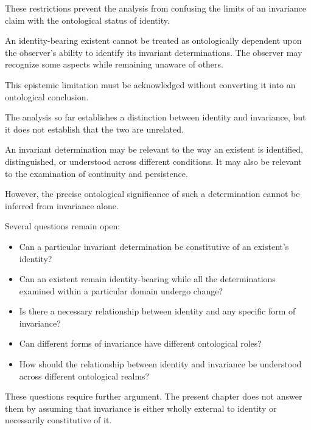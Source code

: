 These restrictions prevent the analysis from
confusing the limits of an invariance claim with
the ontological status of identity.

An identity-bearing existent cannot be treated
as ontologically dependent upon the observer's
ability to identify its invariant determinations.
The observer may recognize some aspects while
remaining unaware of others.

This epistemic limitation must be acknowledged
without converting it into an ontological
conclusion.


The analysis so far establishes a distinction
between identity and invariance, but it does not
establish that the two are unrelated.

An invariant determination may be relevant to
the way an existent is identified, distinguished,
or understood across different conditions.
It may also be relevant to the examination of
continuity and persistence.

However, the precise ontological significance
of such a determination cannot be inferred
from invariance alone.

Several questions remain open:

\begin{itemize}
    \item Can a particular invariant determination
    be constitutive of an existent's identity?

    \item Can an existent remain identity-bearing
    while all the determinations examined within
    a particular domain undergo change?

    \item Is there a necessary relationship between
    identity and any specific form of invariance?

    \item Can different forms of invariance have
    different ontological roles?

    \item How should the relationship between
    identity and invariance be understood across
    different ontological realms?
\end{itemize}

These questions require further argument. The
present chapter does not answer them by assuming
that invariance is either wholly external to
identity or necessarily constitutive of it.

